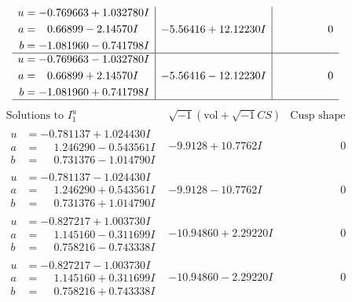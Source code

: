 \documentclass[1p]{elsarticle_modified}
\theoremstyle{definition}
\newcommand{\I}{\sqrt{-1}}
\begin{document}
$$\begin{array}{c|c|c}
\begin{aligned}
u &= -0.769663 + 1.032780 I \\
a &= \phantom{-}0.66899 - 2.14570 I \\
b &= -1.081960 - 0.741798 I\end{aligned}
 & -5.56416 + 12.12230 I & \phantom{-0.000000 } 0 \\ \hline\begin{aligned}
u &= -0.769663 - 1.032780 I \\
a &= \phantom{-}0.66899 + 2.14570 I \\
b &= -1.081960 + 0.741798 I\end{aligned}
 & -5.56416 - 12.12230 I & \phantom{-0.000000 } 0\\
 \hline 
 \end{array}$$\newpage$$\begin{array}{c|c|c}  
\text{Solutions to }I^u_{1}& \I (\text{vol} + \sqrt{-1}CS) & \text{Cusp shape}\\
 \hline 
\begin{aligned}
u &= -0.781137 + 1.024430 I \\
a &= \phantom{-}1.246290 - 0.543561 I \\
b &= \phantom{-}0.731376 - 1.014790 I\end{aligned}
 & -9.9128 + 10.7762 I & \phantom{-0.000000 } 0 \\ \hline\begin{aligned}
u &= -0.781137 - 1.024430 I \\
a &= \phantom{-}1.246290 + 0.543561 I \\
b &= \phantom{-}0.731376 + 1.014790 I\end{aligned}
 & -9.9128 - 10.7762 I & \phantom{-0.000000 } 0 \\ \hline\begin{aligned}
u &= -0.827217 + 1.003730 I \\
a &= \phantom{-}1.145160 - 0.311699 I \\
b &= \phantom{-}0.758216 - 0.743338 I\end{aligned}
 & -10.94860 + 2.29220 I & \phantom{-0.000000 } 0 \\ \hline\begin{aligned}
u &= -0.827217 - 1.003730 I \\
a &= \phantom{-}1.145160 + 0.311699 I \\
b &= \phantom{-}0.758216 + 0.743338 I\end{aligned}
 & -10.94860 - 2.29220 I & \phantom{-0.000000 } 0 \\ \hline\begin{aligned}

\end{aligned}
\end{array}$$
\end{document}
